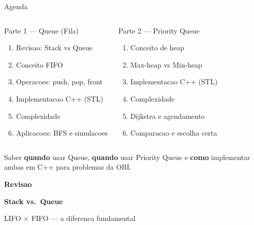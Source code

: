 \documentclass[aspectratio=169,11pt]{beamer}
\begin{document}
\begin{frame}{Agenda}
  \begin{columns}[t]
      \begin{block}{Parte 1 --- Queue (Fila)}
        \begin{enumerate}\small
          \item Revisao: Stack vs Queue
          \item Conceito FIFO
          \item Operacoes: push, pop, front
          \item Implementacao C++ (STL)
          \item Complexidade
          \item Aplicacoes: BFS e simulacoes
        \end{enumerate}
      \end{block}
      \begin{block}{Parte 2 --- Priority Queue}
        \begin{enumerate}\small
          \item Conceito de heap
          \item Max-heap vs Min-heap
          \item Implementacao C++ (STL)
          \item Complexidade
          \item Dijkstra e agendamento
          \item Comparacao e escolha certa
        \end{enumerate}
      \end{block}
  \end{columns}
  \vspace{0.3cm}
  \begin{tcolorbox}[caixaAmarelo,title={Objetivo da aula}]
    \small Saber \textbf{quando} usar Queue, \textbf{quando} usar Priority Queue
    e \textbf{como} implementar ambas em C++ para problemas da OBI.
  \end{tcolorbox}
\end{frame}

{
\begin{frame}[noframenumbering]
  \centering\vspace{1.0cm}
  {\fontsize{32}{38}\selectfont\bfseries\color{gemaBlue} Revisao}\par
  \vspace{0.3cm}
  {\Large\color{gemaCyan}\bfseries Stack vs.\ Queue}\par
  \vspace{0.2cm}
  {\color{gray}\small LIFO $\times$ FIFO --- a diferenca fundamental}
\end{frame}
}
\end{document}

